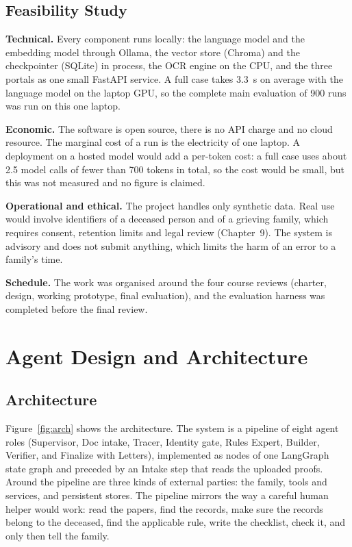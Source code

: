 \documentclass[12pt,a4paper,oneside]{report}
\begin{document}
\section{Feasibility Study}\label{sec:feas}
\textbf{Technical.} Every component runs locally: the language model and the embedding model through Ollama, the vector store (Chroma) and the checkpointer (SQLite) in process, the OCR engine on the CPU, and the three portals as one small FastAPI service. A full case takes 3.3~s on average with the language model on the laptop GPU, so the complete main evaluation of 900 runs was run on this one laptop.

\textbf{Economic.} The software is open source, there is no API charge and no cloud resource. The marginal cost of a run is the electricity of one laptop. A deployment on a hosted model would add a per-token cost: a full case uses about 2.5 model calls of fewer than 700 tokens in total, so the cost would be small, but this was not measured and no figure is claimed.

\textbf{Operational and ethical.} The project handles only synthetic data. Real use would involve identifiers of a deceased person and of a grieving family, which requires consent, retention limits and legal review (Chapter~9). The system is advisory and does not submit anything, which limits the harm of an error to a family's time.

\textbf{Schedule.} The work was organised around the four course reviews (charter, design, working prototype, final evaluation), and the evaluation harness was completed before the final review.

\chapter{Agent Design and Architecture}\label{ch:design}
\section{Architecture}
Figure~\ref{fig:arch} shows the architecture. The system is a pipeline of eight agent roles (Supervisor, Doc intake, Tracer, Identity gate, Rules Expert, Builder, Verifier, and Finalize with Letters), implemented as nodes of one LangGraph state graph and preceded by an Intake step that reads the uploaded proofs. Around the pipeline are three kinds of external parties: the family, tools and services, and persistent stores. The pipeline mirrors the way a careful human helper would work: read the papers, find the records, make sure the records belong to the deceased, find the applicable rule, write the checklist, check it, and only then tell the family.
\end{document}
